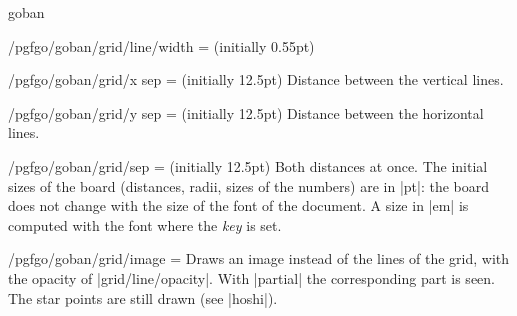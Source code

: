 \begin{environment}{{goban}}
\begin{key}{/pgfgo/goban/grid/line/width = (initially 0.55pt)}
\begin{codeexample}[]
			\begin{goban}[name = a]
			\end{goban}

			\begin{goban}[grid = {line = {width = 1.5pt}}, resume = a]
			\end{goban}
		\end{codeexample}
	\end{key}

	\begin{key}{/pgfgo/goban/grid/x sep = (initially 12.5pt)}
		Distance between the vertical lines.
	\end{key}

	\begin{key}{/pgfgo/goban/grid/y sep = (initially 12.5pt)}
		Distance between the horizontal lines.
	\end{key}

	\begin{key}{/pgfgo/goban/grid/sep = (initially 12.5pt)}
		Both distances at once. The initial sizes of the board (distances, radii, sizes of the numbers) are in |pt|: the board does not change with the size of the font of the document. A size in |em| is computed with the font where the \emph{key} is set.

		\begin{codeexample}[]
			\begin{goban}[5, grid = {x sep = 1.8em}]
			\end{goban}

			\begin{goban}[5, grid = {sep = 0.9em}]
			\end{goban}
		\end{codeexample}
	\end{key}

	\begin{key}{/pgfgo/goban/grid/image =}
		Draws an image instead of the lines of the grid, with the opacity of |grid/line/opacity|. With |partial| the corresponding part is seen. The star points are still drawn (see |hoshi|).

		\begin{codeexample}[]
			\begin{goban}[9, grid = {image = {file = pgfgo-grid.png}}, hoshi = false]
			\end{goban}


\end{codeexample}
\end{key}
\end{environment}
